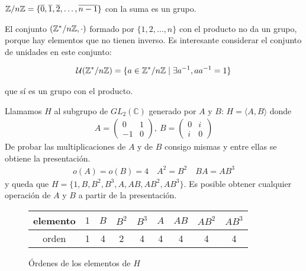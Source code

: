 \begin{ej}
	$\mathbb{Z}/n\mathbb{Z} = \{\overline{0}, \overline{1}, \overline{2}, \dots, \overline{n-1}\}$ con la suma es un grupo.
\end{ej}

\begin{ej}
	El conjunto $(\mathbb{Z}^*/n\mathbb{Z}, \cdot)$ formado por $\{1, 2, \dots, n\}$ con el producto no da un grupo, porque hay elementos que no tienen inverso. Es interesante considerar el conjunto de unidades en este conjunto:
	
	\begin{align*}
		\mathcal{U}(\mathbb{Z}^*/n\mathbb{Z}) = \{a \in \mathbb{Z}^*/n\mathbb{Z} \mid \exists a^{-1}, a a^{-1} = 1\}
	\end{align*}
	
	que sí es un grupo con el producto.
\end{ej}

\begin{ej}
	\label{ej:grupocuaterniones}
	Llamamos $H$ al subgrupo de $GL_2(\mathbb{C})$ generado por $A$ y $B$: $H = \langle A, B\rangle$ donde 
	\begin{align*}
	A = \left(\begin{array}{cc}
	0 & 1 \\ -1 & 0
	\end{array}\right),\ B = \left(\begin{array}{cc}
	0 & i \\ i & 0
	\end{array}\right)
	\end{align*}
	De probar las multiplicaciones de $A$ y de $B$ consigo mismas y entre ellas se obtiene la presentación.
	\begin{align*}
	o(A) = o(B) = 4\quad A^2 = B^2 \quad BA = AB^3
	\end{align*}
	y queda que $H = \{1, B, B^2, B^3, A, AB, AB^2, AB^3\}$. Es posible obtener cualquier operación de $A$ y $B$ a partir de la presentación.
	
	\begin{figure}[h]
		\centering
		\begin{tabular}{c|cccccccc}
			elemento & $1$ & $B$ & $B^2$ & $B^3$ & $A$ & $AB$ & $AB^2$ & $AB^3$ \\ \hline
			orden   &  1  &  4  &   2   &   4   &  4  &  4   &   4    &   4
		\end{tabular}
		\caption{Órdenes de los elementos de $H$}
	\end{figure}
\end{ej}

